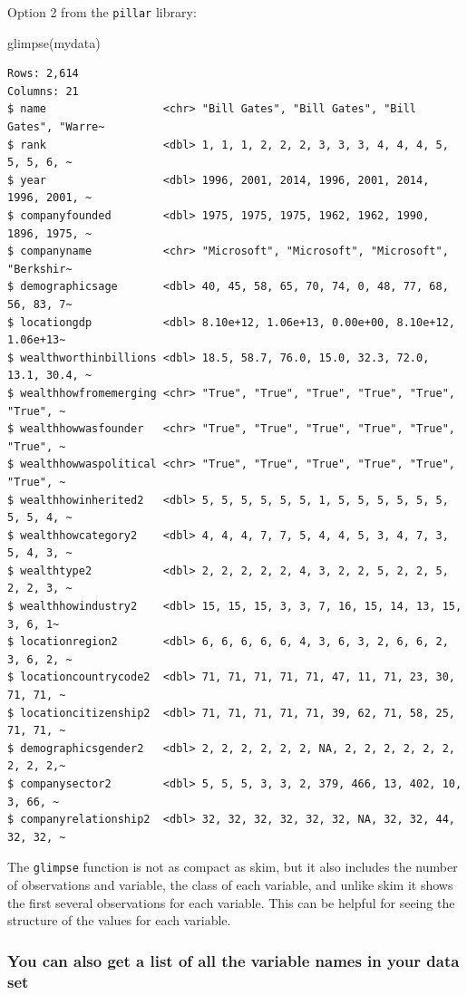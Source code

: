 \documentclass[
]{book}
\newenvironment{Shaded}{\begin{snugshade}}{\end{snugshade}}
\newcommand{\FunctionTok}[1]{\textcolor[rgb]{0.00,0.00,0.00}{#1}}
\newcommand{\NormalTok}[1]{#1}
\begin{document}
Option 2 from the \texttt{pillar} library:

\begin{Shaded}
\begin{Highlighting}[]
\FunctionTok{glimpse}\NormalTok{(mydata)}
\end{Highlighting}
\end{Shaded}

\begin{verbatim}
Rows: 2,614
Columns: 21
$ name                  <chr> "Bill Gates", "Bill Gates", "Bill Gates", "Warre~
$ rank                  <dbl> 1, 1, 1, 2, 2, 2, 3, 3, 3, 4, 4, 4, 5, 5, 5, 6, ~
$ year                  <dbl> 1996, 2001, 2014, 1996, 2001, 2014, 1996, 2001, ~
$ companyfounded        <dbl> 1975, 1975, 1975, 1962, 1962, 1990, 1896, 1975, ~
$ companyname           <chr> "Microsoft", "Microsoft", "Microsoft", "Berkshir~
$ demographicsage       <dbl> 40, 45, 58, 65, 70, 74, 0, 48, 77, 68, 56, 83, 7~
$ locationgdp           <dbl> 8.10e+12, 1.06e+13, 0.00e+00, 8.10e+12, 1.06e+13~
$ wealthworthinbillions <dbl> 18.5, 58.7, 76.0, 15.0, 32.3, 72.0, 13.1, 30.4, ~
$ wealthhowfromemerging <chr> "True", "True", "True", "True", "True", "True", ~
$ wealthhowwasfounder   <chr> "True", "True", "True", "True", "True", "True", ~
$ wealthhowwaspolitical <chr> "True", "True", "True", "True", "True", "True", ~
$ wealthhowinherited2   <dbl> 5, 5, 5, 5, 5, 5, 1, 5, 5, 5, 5, 5, 5, 5, 5, 4, ~
$ wealthhowcategory2    <dbl> 4, 4, 4, 7, 7, 5, 4, 4, 5, 3, 4, 7, 3, 5, 4, 3, ~
$ wealthtype2           <dbl> 2, 2, 2, 2, 2, 4, 3, 2, 2, 5, 2, 2, 5, 2, 2, 3, ~
$ wealthhowindustry2    <dbl> 15, 15, 15, 3, 3, 7, 16, 15, 14, 13, 15, 3, 6, 1~
$ locationregion2       <dbl> 6, 6, 6, 6, 6, 4, 3, 6, 3, 2, 6, 6, 2, 3, 6, 2, ~
$ locationcountrycode2  <dbl> 71, 71, 71, 71, 71, 47, 11, 71, 23, 30, 71, 71, ~
$ locationcitizenship2  <dbl> 71, 71, 71, 71, 71, 39, 62, 71, 58, 25, 71, 71, ~
$ demographicsgender2   <dbl> 2, 2, 2, 2, 2, 2, NA, 2, 2, 2, 2, 2, 2, 2, 2, 2,~
$ companysector2        <dbl> 5, 5, 5, 3, 3, 2, 379, 466, 13, 402, 10, 3, 66, ~
$ companyrelationship2  <dbl> 32, 32, 32, 32, 32, 32, NA, 32, 32, 44, 32, 32, ~
\end{verbatim}

The \texttt{glimpse} function is not as compact as skim, but it also includes the number of observations and variable, the class of each variable, and unlike skim it shows the first several observations for each variable. This can be helpful for seeing the structure of the values for each variable.

\hypertarget{names}{%
\subsubsection*{You can also get a list of all the variable names in your data set}\label{names}}
\end{document}
